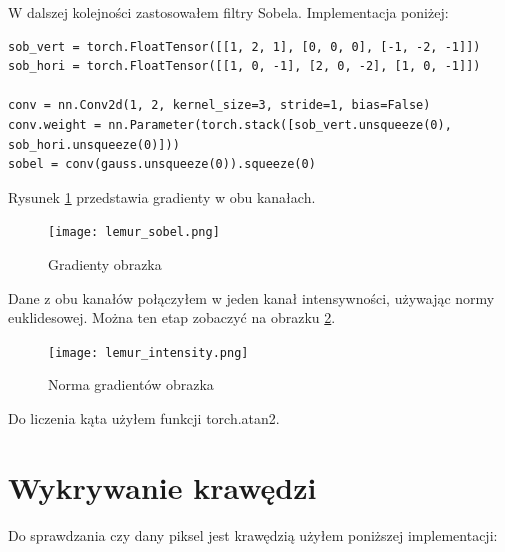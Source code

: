 \documentclass[a4paper]{article}
\begin{document}
W dalszej kolejności zastosowałem filtry Sobela. Implementacja poniżej:
\begin{lstlisting}
sob_vert = torch.FloatTensor([[1, 2, 1], [0, 0, 0], [-1, -2, -1]])
sob_hori = torch.FloatTensor([[1, 0, -1], [2, 0, -2], [1, 0, -1]])

conv = nn.Conv2d(1, 2, kernel_size=3, stride=1, bias=False)
conv.weight = nn.Parameter(torch.stack([sob_vert.unsqueeze(0), sob_hori.unsqueeze(0)]))
sobel = conv(gauss.unsqueeze(0)).squeeze(0)
\end{lstlisting}

Rysunek
\ref{fig:lemur_grad} przedstawia gradienty w obu kanałach.

\begin{figure}[H]
    \centering
    \texttt{[image: lemur\_sobel.png]}
    \caption{Gradienty obrazka}
    \label{fig:lemur_grad}
\end{figure}

Dane z obu kanałów połączyłem w jeden kanał intensywności,
używając normy euklidesowej. Można ten etap zobaczyć na obrazku
\ref{fig:lemur_grad_norm}.

\begin{figure}[H]
    \centering
    \texttt{[image: lemur\_intensity.png]}
    \caption{Norma gradientów obrazka}
    \label{fig:lemur_grad_norm}
\end{figure}

Do liczenia kąta użyłem funkcji torch.atan2.

\section{ Wykrywanie krawędzi }

Do sprawdzania czy dany piksel jest krawędzią użyłem poniższej implementacji:
\end{document}
